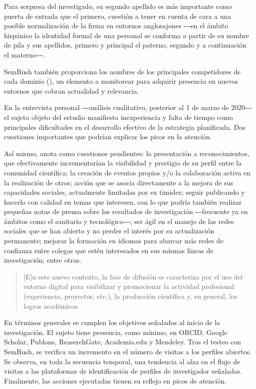 \documentclass{textolivre}
\begin{document}
Para sorpresa del investigado, su segundo apellido es más importante como puerta de entrada que el primero, cuestión a tener en cuenta de cara a una posible normalización de la firma en entornos anglosajones ―en el ámbito hispánico la identidad formal de una personal se conforma a partir de su nombre de pila y sus apellidos, primero y principal el paterno, segundo y a continuación el materno―.

SemRush también proporciona los nombres de los principales competidores de cada dominio (), un elemento a monitorear para adquirir presencia en nuevos entornos que cobran actualidad y relevancia.

En la entrevista personal ―análisis cualitativo, posterior al 1 de marzo de 2020― el sujeto objeto del estudio manifiesta inexperiencia y falta de tiempo como principales dificultades en el desarrollo efectivo de la estrategia planificada. Dos cuestiones importantes que podrían explicar los picos en la atención. 

Así mismo, anota como cuestiones pendientes: la presentación a reconocimientos, que efectivamente incrementarían la visibilidad y prestigio de su perfil entre la comunidad científica; la creación de eventos propios y/o la colaboración activa en la realización de otros; acción que se asocia directamente a la mejora de sus capacidades sociales, actualmente limitadas por su timidez; seguir publicando y hacerlo con calidad en temas que interesen, con lo que podría también realizar pequeñas notas de prensa sobre los resultados de investigación ―frecuente ya en ámbitos como el sanitario y tecnológico―; ser ágil en el manejo de las redes sociales que se han abierto y no perder el interés por su actualización permanente; mejorar la formación en idiomas para abarcar más redes de confianza entre colegas que estén interesados en sus mismas líneas de investigación; entre otras.

\begin{quote}
    [E]n este nuevo contexto, la fase de difusión se caracteriza por el uso del entorno digital para visibilizar y promocionar la actividad profesional (experiencia, proyectos, etc.), la producción científica y, en general, los logros académicos. \cite[p. 70]{siso_calvo_plataformas_2020}.
\end{quote}

En términos generales se cumplen los objetivos señalados al inicio de la investigación. El sujeto tiene presencia, como mínimo, en ORCID, Google Scholar, Publons, ReaserchGate, Academia.edu y Mendeley. Tras el testeo con SemRush, se verifica un incremento en el número de visitas a los perfiles abiertos. Se observa, en toda la secuencia temporal, una tendencia al alza en el flujo de visitas a las plataformas de identificación de perfiles de investigador señaladas. Finalmente, las acciones ejecutadas tienen su reflejo en picos de atención.
\end{document}
